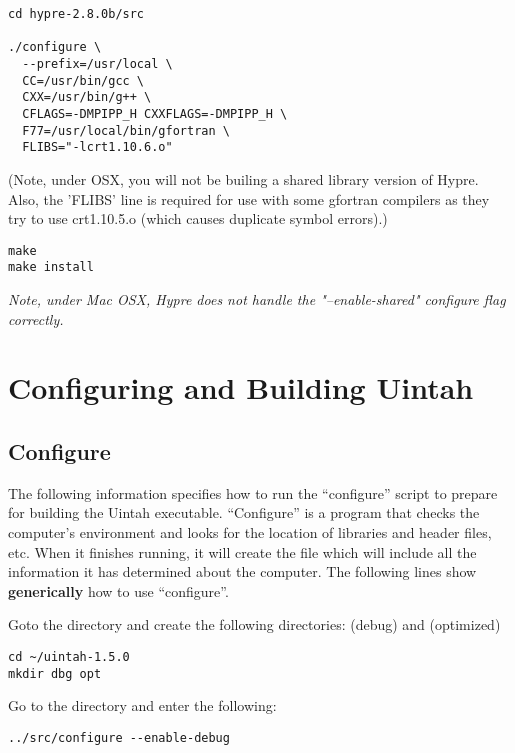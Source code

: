 \documentclass[11pt,fleqn]{book} %
\begin{document}
\begin{lstlisting}
cd hypre-2.8.0b/src

./configure \
  --prefix=/usr/local \
  CC=/usr/bin/gcc \
  CXX=/usr/bin/g++ \
  CFLAGS=-DMPIPP_H CXXFLAGS=-DMPIPP_H \
  F77=/usr/local/bin/gfortran \
  FLIBS="-lcrt1.10.6.o"

\end{lstlisting}

(Note, under OSX, you will not be builing a shared library version of
Hypre.  Also, the 'FLIBS' line is required for use with some gfortran
compilers as they try to use crt1.10.5.o (which causes duplicate
symbol errors).)

\begin{lstlisting}
make
make install
\end{lstlisting}

\emph{Note, under Mac OSX, Hypre does not handle the "--enable-shared" configure
  flag correctly.}

\chapter{Configuring and Building Uintah}

\section{Configure}

The following information specifies how to run the ``configure''
script to prepare for building the Uintah executable.  ``Configure''
is a program that checks the computer's environment and looks for the
location of libraries and header files, etc.  When it finishes
running, it will create the  file which will include
all the information it has determined about the computer.  The
following lines show \textbf{generically} how to use ``configure''.

Goto the directory \TT{ \textasciitilde/uintah} and create the
following directories: \TT{dbg} (debug) and \TT{opt} (optimized)

\begin{lstlisting}
cd ~/uintah-1.5.0
mkdir dbg opt
\end{lstlisting}

Go to the  directory and enter the following:

\begin{lstlisting}
../src/configure --enable-debug        
\end{lstlisting}
\end{document}
